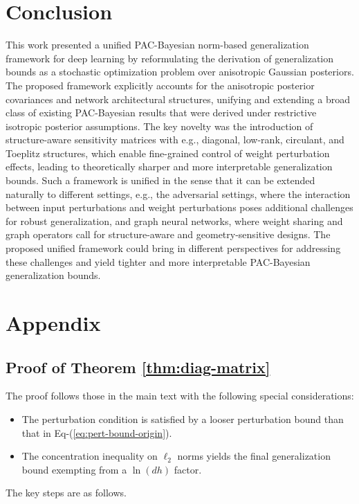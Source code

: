 \documentclass[journal]{IEEEtran} %
\def\eqref#1{Eq-(\ref{#1})}
\begin{document}
\section{Conclusion}
This work presented a unified PAC-Bayesian norm-based generalization framework for deep learning by reformulating the derivation of generalization bounds as a stochastic optimization problem over anisotropic Gaussian posteriors. The proposed framework explicitly accounts for the anisotropic posterior covariances and network architectural structures, unifying and extending a broad class of existing PAC-Bayesian results that were derived under restrictive isotropic posterior assumptions. The key novelty was the introduction of structure-aware sensitivity matrices with e.g., diagonal, low-rank, circulant, and Toeplitz structures, which enable fine-grained control of weight perturbation effects, leading to theoretically sharper and more interpretable generalization bounds. 
Such a framework is unified in the sense that it can be extended naturally to different settings, e.g., the adversarial settings, where the interaction between input perturbations and weight perturbations poses additional challenges for robust generalization, and graph neural networks, where weight sharing and graph operators call for structure-aware and geometry-sensitive designs. The proposed unified framework could bring in different perspectives for addressing these challenges and yield tighter and more interpretable PAC-Bayesian generalization bounds.

\section{Appendix}
\subsection{Proof of Theorem \ref{thm:diag-matrix}}
\label{proof:diag-matrix}
The proof follows those in the main text with the following special considerations:
\begin{itemize}
    \item The perturbation condition is satisfied by a looser perturbation bound than that in \eqref{eq:pert-bound-origin}.
    \item The concentration inequality on $\ell_2$ norms yields the final generalization bound exempting from a $\ln (dh)$ factor.
\end{itemize}
The key steps are as follows.
\end{document}
